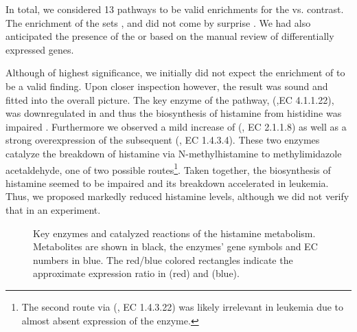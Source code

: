  In total, we considered \num{13} pathways to be valid enrichments for the \dnmtchip vs. \dnmtwt contrast. The enrichment of the sets ,  and  did not come by surprise . We had also anticipated the presence of the  or  based on the manual review of differentially expressed genes.

Although of highest significance, we initially did not expect the enrichment of  to be a valid finding. Upon closer inspection however, the result was sound and fitted into the overall picture. The key enzyme of the pathway, (,EC 4.1.1.22), was downregulated in \dnmtchip and thus the biosynthesis of histamine from histidine was impaired . Furthermore we observed a mild increase of  (, EC 2.1.1.8) as well as a strong overexpression of the subsequent (, EC 1.4.3.4). These two enzymes catalyze the breakdown of histamine via N-methylhistamine to methylimidazole acetaldehyde, one of two possible routes\footnote{ The second route via  (, EC 1.4.3.22) was likely irrelevant in leukemia due to almost absent expression of the enzyme.}. Taken together, the biosynthesis of histamine seemed to be impaired and its breakdown accelerated in  \dnmtchip \mllafnine leukemia. Thus, we proposed markedly reduced histamine levels, although we did not verify that in an experiment. 

\begin{figure}[!ht]
	\centering
	\def\svgwidth{\textwidth}
	 
	\caption{Key enzymes and catalyzed reactions of the histamine metabolism. Metabolites are shown in black, the enzymes' gene symbols and EC numbers in blue. The red/blue colored rectangles indicate the approximate expression ratio in \dnmtchip (red) and \dnmtwt (blue).}
	\label{fig:genes:histaminepathway}
\end{figure}

